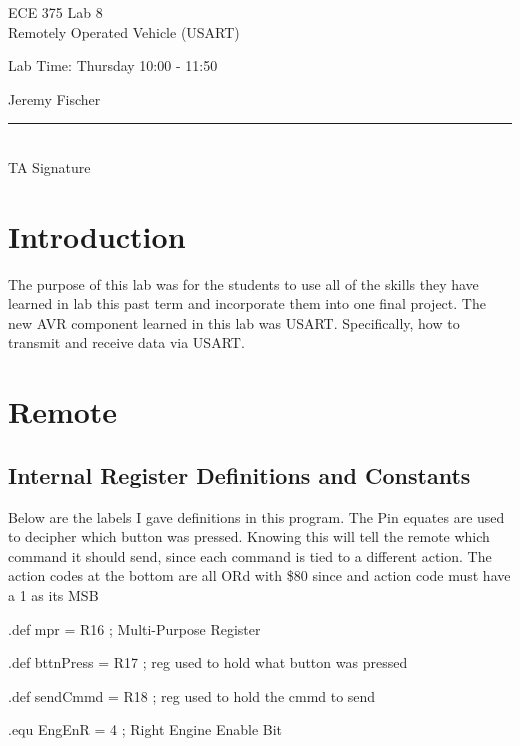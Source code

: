 \documentclass[12pt,letterpaper]{article}
\begin{document}
\begin{titlepage}
    \vspace*{4cm}
    \begin{flushright}
    {\huge
        ECE 375 Lab 8\\[1cm]
    }
    {\large
        Remotely Operated Vehicle (USART)
    }
    \end{flushright}
    \begin{flushleft}
    Lab Time: Thursday  10:00 - 11:50
    \end{flushleft}
    \begin{flushright}
    Jeremy Fischer

    \vfill
    \rule{5in}{.5mm}\\
    TA Signature
    \end{flushright}

\end{titlepage}

\section{Introduction}
	The purpose of this lab was for the students to use all of the skills they have learned in lab this past term and incorporate them into one final project.
	The new AVR component learned in this lab was USART.
	Specifically, how to transmit and receive data via USART.
	
\section{Remote}
\subsection{Internal Register Definitions and Constants}

	Below are the labels I gave definitions in this program. 
	The Pin equates are used to decipher which button was pressed.
	Knowing this will tell the remote which command it should send, since each command is tied to a different action.
	The action codes at the bottom are all ORd with \$80 since and action code must have a 1 as its MSB
	
	.def	mpr = R16			\hfill	; Multi-Purpose Register
	
	.def	bttnPress = R17		\hfill	; reg used to hold what button was pressed

	.def 	sendCmmd = R18		\hfill	; reg used to hold the cmmd to send
	
	.equ	EngEnR = 4			\hfill	; Right Engine Enable Bit
\end{document}
